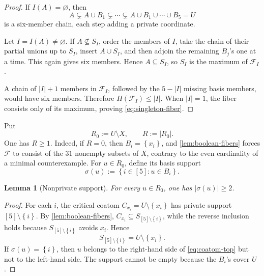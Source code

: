 \documentclass[11pt,reqno]{amsart}
\numberwithin{equation}{section}
\newtheorem{lemma}[lemma]{Lemma}
\theoremstyle{definition}
\theoremstyle{remark}
\newcommand{\F}{\mathcal{F}}
\newcommand{\1}{\mathbf{1}}
\newcommand{\set}[1]{\left\{#1\right\}}
\newcommand{\abs}[1]{\left|#1\right|}
\begin{document}
\begin{proof}
If \(I(A)=\varnothing\), then
\[
A
\subsetneq A\cup B_1
\subsetneq\cdots\subsetneq
A\cup B_1\cup\cdots\cup B_5=U
\]
is a six-member chain, each step adding a private coordinate.

Let \(I=I(A)\ne\varnothing\).  If \(A\nsubseteq S_I\), order the members of \(I\), take the chain of their partial unions up to \(S_I\), insert \(A\cup S_I\), and then adjoin the remaining \(B_j\)'s one at a time.  This again gives six members.  Hence \(A\subseteq S_I\), so \(S_I\) is the maximum of \(\F_I\).

A chain of \(\abs I+1\) members in \(\F_I\), followed by the \(5-\abs I\) missing basis members, would have six members.  Therefore \(H(\F_I)\le\abs I\).  When \(\abs I=1\), the fiber consists only of its maximum, proving \cref{eq:singleton-fiber}.
\end{proof}

Put
\begin{equation}\label{eq:R0}
R_0:=U\setminus X,
\qquad R:=\abs{R_0}.
\end{equation}
One has \(R\ge1\).  Indeed, if \(R=0\), then \(B_i=\set{x_i}\), and \cref{lem:boolean-fibers} forces \(\F\) to consist of the \(31\) nonempty subsets of \(X\), contrary to the even cardinality of a minimal counterexample.
For \(u\in R_0\), define its basis support
\begin{equation}\label{eq:sigma-u}
\sigma(u):=\set{i\in[5]:u\in B_i}.
\end{equation}

\begin{lemma}[Nonprivate support]\label{lem:support-atleast2}
For every \(u\in R_0\), one has \(\abs{\sigma(u)}\ge2\).
\end{lemma}

\begin{proof}
For each \(i\), the critical coatom \(C_{x_i}=U\setminus\set{x_i}\) has private support \([5]\setminus\set{i}\).  By \cref{lem:boolean-fibers},
\(
C_{x_i}\subseteq S_{[5]\setminus\set{i}}
\), while the reverse inclusion holds because \(S_{[5]\setminus\set{i}}\) avoids \(x_i\).  Hence
\begin{equation}\label{eq:coatom-top}
S_{[5]\setminus\set{i}}=U\setminus\set{x_i}.
\end{equation}
If \(\sigma(u)=\set{i}\), then \(u\) belongs to the right-hand side of \cref{eq:coatom-top} but not to the left-hand side.  The support cannot be empty because the \(B_i\)'s cover \(U\).
\end{proof}
\end{document}
